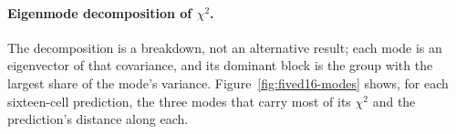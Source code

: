 \paragraph{Eigenmode decomposition of $\chi^{2}$.} The decomposition is a breakdown, not an alternative result; each mode is an eigenvector of that covariance, and its dominant block is the group with the largest share of the mode's variance. Figure~\ref{fig:fived16-modes} shows, for each sixteen-cell prediction, the three modes that carry most of its $\chi^2$ and the prediction's distance along each.


